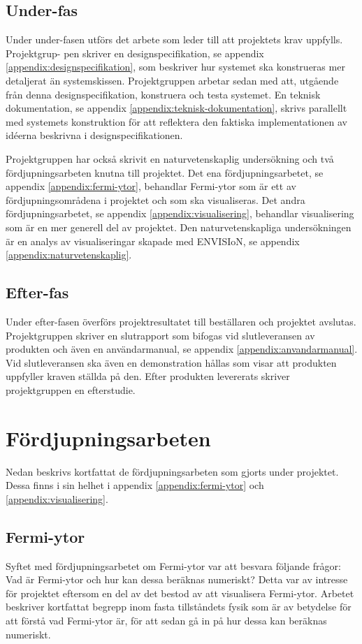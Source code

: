 \documentclass[a4paper,12pt,twoside,openright]{report}
\begin{document}
\subsection{Under-fas}
Under  under-fasen  utförs  det  arbete  som  leder  till  att  projektets  krav  uppfylls.  Projektgrup-
pen skriver en designspecifikation, se appendix \ref{appendix:designspecifikation},
som beskriver hur systemet ska konstrueras mer detaljerat än
systemskissen. Projektgruppen arbetar sedan med att, utgående från denna designspecifikation, konstruera och testa systemet. En teknisk dokumentation, se appendix \ref{appendix:teknisk-dokumentation}, skrivs parallellt med systemets konstruktion för att reflektera den faktiska implementationen av idéerna beskrivna i designspecifikationen. 

Projektgruppen har också skrivit en naturvetenskaplig undersökning och två fördjupningsarbeten knutna till projektet. Det ena fördjupningsarbetet, se appendix \ref{appendix:fermi-ytor}, behandlar Fermi-ytor som är ett av fördjupningsområdena i projektet och som ska visualiseras. Det andra fördjupningsarbetet, se appendix \ref{appendix:visualisering}, behandlar visualisering som är en mer generell del av projektet. Den naturvetenskapliga undersökningen är en analys av visualiseringar skapade med ENVISIoN, se appendix \ref{appendix:naturvetenskaplig}.

\subsection{Efter-fas}
Under efter-fasen överförs projektresultatet till beställaren och projektet avslutas. Projektgruppen skriver en slutrapport som bifogas vid slutleveransen av produkten och även en användarmanual, se appendix \ref{appendix:anvandarmanual}. Vid slutleveransen ska
även en demonstration hållas som visar att produkten uppfyller kraven ställda på den. Efter produkten levererats skriver projektgruppen en efterstudie.

\section{Fördjupningsarbeten}
\label{ch:fördjupningsarbeten}
Nedan beskrivs kortfattat de fördjupningsarbeten som gjorts under projektet. Dessa finns i sin helhet i appendix \ref{appendix:fermi-ytor} och \ref{appendix:visualisering}. 
\subsection{Fermi-ytor}
Syftet med fördjupningsarbetet om Fermi-ytor var att besvara följande frågor: Vad är Fermi-ytor och hur kan dessa beräknas numeriskt? Detta var av intresse för projektet eftersom en del av det bestod av att visualisera Fermi-ytor. Arbetet beskriver kortfattat begrepp inom fasta tillståndets fysik som är av betydelse för att förstå vad Fermi-ytor är, för att sedan gå in på hur dessa kan beräknas numeriskt.
\end{document}
